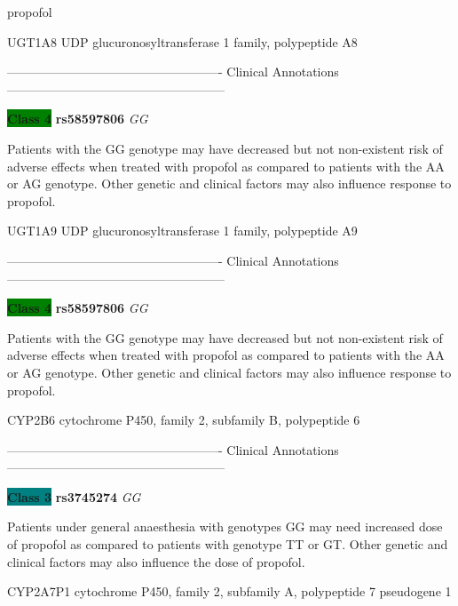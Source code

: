 \documentclass{resume} %
\begin{document}
\begin{rSection}{ propofol }
\begin{rSubsection}{ UGT1A8 }{ UDP glucuronosyltransferase 1 family, polypeptide A8 }{}{}
\item[] ---------------------------------------------------- Clinical Annotations -----------------------------------------------------\newline
\item \textbf{\colorbox{green} {Class 4}} \textbf{ rs58597806 } \textit{ GG }
\item[] Patients with the GG genotype may have decreased but not non-existent risk of adverse effects when treated with propofol as compared to patients with the AA or AG genotype. Other genetic and clinical factors may also influence response to propofol.
\end{rSubsection}\begin{rSubsection}{ UGT1A9 }{ UDP glucuronosyltransferase 1 family, polypeptide A9 }{}{}
\item[]

\item[] ---------------------------------------------------- Clinical Annotations -----------------------------------------------------\newline
\item \textbf{\colorbox{green} {Class 4}} \textbf{ rs58597806 } \textit{ GG }
\item[] Patients with the GG genotype may have decreased but not non-existent risk of adverse effects when treated with propofol as compared to patients with the AA or AG genotype. Other genetic and clinical factors may also influence response to propofol.
\end{rSubsection}\begin{rSubsection}{ CYP2B6 }{ cytochrome P450, family 2, subfamily B, polypeptide 6 }{}{}
\item[]

\item[] ---------------------------------------------------- Clinical Annotations -----------------------------------------------------\newline
\item \textbf{\colorbox{teal} {Class 3}} \textbf{ rs3745274 } \textit{ GG }
\item[] Patients under general anaesthesia with genotypes GG may need increased dose of propofol as compared to patients with genotype TT or GT. Other genetic and clinical factors may also influence the dose of propofol. 
\end{rSubsection}\begin{rSubsection}{ CYP2A7P1 }{ cytochrome P450, family 2, subfamily A, polypeptide 7 pseudogene 1 }{}{}
\item[]


\end{rSubsection}
\end{rSection}
\end{document}
